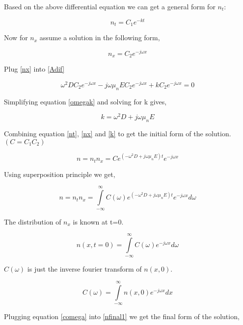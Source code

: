 Based on the above differential equation we can get a general form for $n_t$:

\begin{equation}
n_t=C_1 e^{-kt}
\label{nt}
\end{equation}

Now for $n_x$ assume a solution in the following form,

\begin{equation}
n_x=C_2 e^{-j\omega x}
\label{nx}
\end{equation}

Plug \eqref{nx} into \eqref{Adif}

\begin{equation}
\omega^2 D C_2 e^{-j\omega x}-j\omega \mu_n E C_2 e^{-j\omega x}+kC_2e^{-j\omega x}=0
\label{omegak}
\end{equation}

Simplifying equation \eqref{omegak} and solving for k gives,

\begin{equation}
k=\omega^2 D+j\omega \mu_n E
\label{k}
\end{equation}

Combining equation \eqref{nt}, \eqref{nx} and \eqref{k} to get the initial form of the solution. $(C=C_1C_2)$

\begin{equation}
n=n_tn_x=Ce^{(-\omega^2 D + j\omega \mu_n E)t} e^{-j\omega x}
\end{equation}

Using superposition principle we get,

\begin{equation}
n=n_tn_x=\int\limits_{-\infty}^{\infty}C(\omega)e^{(-\omega^2 D + j\omega \mu_n E)t} e^{-j\omega x}d\omega
\label{nfinal1}
\end{equation}

The distribution of $n_x$ is known at t=0.

\begin{equation}
n(x,t=0)=\int\limits_{-\infty}^{\infty}C(\omega) e^{-j\omega x}d\omega
\end{equation}

$C(\omega)$ is just the inverse fourier transform of $n(x,0)$.

\begin{equation}
C(\omega)=\int\limits_{-\infty}^{\infty}n(x,0)e^{-j\omega x}dx
\label{comega}
\end{equation}

Plugging equation \eqref{comega} into \eqref{nfinal1} we get the final form of the solution,

